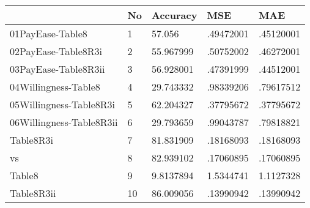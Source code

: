 \begin{table}[htbp]
\begin{tabular}{|l|l|l|l|l|}\hline  
 & No  & Accuracy  & MSE  & MAE  \\ \hline  
01PayEase-Table8 & 1 & 57.056 & .49472001 & .45120001 \\ \hline 
02PayEase-Table8R3i & 2 & 55.967999 & .50752002 & .46272001 \\ \hline 
03PayEase-Table8R3ii & 3 & 56.928001 & .47391999 & .44512001 \\ \hline 
04Willingness-Table8 & 4 & 29.743332 & .98339206 & .79617512 \\ \hline 
05Willingness-Table8R3i & 5 & 62.204327 & .37795672 & .37795672 \\ \hline 
06Willingness-Table8R3ii & 6 & 29.793659 & .99043787 & .79818821 \\ \hline 
Table8R3i & 7 & 81.831909 & .18168093 & .18168093 \\ \hline 
vs & 8 & 82.939102 & .17060895 & .17060895 \\ \hline 
Table8 & 9 & 9.8137894 & 1.5344741 & 1.1127328 \\ \hline 
Table8R3ii & 10 & 86.009056 & .13990942 & .13990942 \\ \hline 
  \end{tabular}
\end{table}
